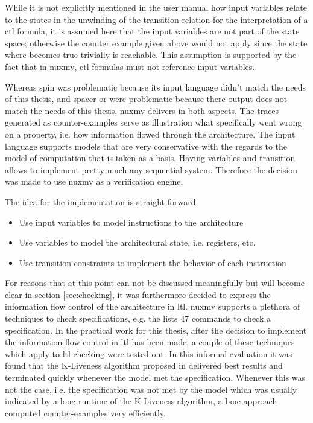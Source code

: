 \begin{example}
    While it is not explicitly mentioned in the user manual how input variables relate to the states in the unwinding of the transition relation for the interpretation of a \gls{ctl} formula, it is assumed here that the input variables are not part of the state space; otherwise the counter example given above would not apply since the state where  becomes true trivially is reachable.
    This assumption is supported by the fact that in \gls{nuxmv}, \gls{ctl} formulas must not reference input variables.
\end{example}

Whereas \gls{spin} was problematic because its input language didn't match the needs of this thesis, and \gls{spacer} or \muZ{} were problematic because there output does not match the needs of this thesis, \gls{nuxmv} delivers in both aspects.
The traces generated as counter-examples serve as illustration what specifically went wrong on a property, i.e. how information flowed through the architecture.
The input language supports models that are very conservative with the regards to the model of computation that is taken as a basis.
Having variables and transition allows to implement pretty much any sequential system.
Therefore the decision was made to use \gls{nuxmv} as a verification engine.

The idea for the implementation is straight-forward:
\begin{itemize}
    \item Use input variables to model instructions to the architecture
    \item Use variables to model the architectural state, i.e. registers, etc.
    \item Use transition constraints to implement the behavior of each instruction
\end{itemize}

For reasons that at this point can not be discussed meaningfully but will become clear in section \ref{sec:checking}, it was furthermore decided to express the information flow control of the architecture in \gls{ltl}.
\gls{nuxmv} supports a plethora of techniques to check specifications, e.g. the  \cite{nuXmv} lists 47 commands to check a specification.
In the practical work for this thesis, after the decision to implement the information flow control in \gls{ltl} has been made, a couple of these techniques which apply to \gls{ltl}-checking were tested out.
In this informal evaluation it was found that the K-Liveness algorithm proposed in \cite{Claessen12} delivered best results and terminated quickly whenever the model met the specification.
Whenever this was not the case, i.e. the specification was not met by the model which was usually indicated by a long runtime of the K-Liveness algorithm, a \gls{bmc} approach computed counter-examples very efficiently.

